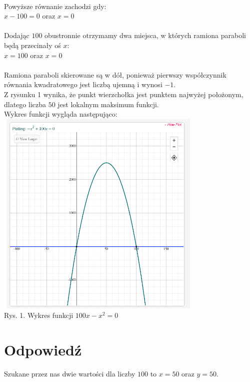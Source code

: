 \documentclass[UTF8]{article}
\begin{document}
\\Powyższe równanie zachodzi gdy:~
\\$x-100 = 0$ oraz $x=0$\\
\\Dodając $100$ obustronnie otrzymamy dwa miejsca, w których ramiona paraboli będą przecinały oś $x$:~
\\$x = 100$ oraz $x = 0$\\
\\Ramiona paraboli skierowane są w dół, ponieważ pierwszy współczynnik równania kwadratowego jest liczbą ujemną i wynosi $-1$. ~ 
\\Z rysunku 1 wynika, że punkt wierzchołka jest punktem najwyżej położonym, dlatego liczba $50$ jest lokalnym maksimum funkcji.~ 
\\Wykres funkcji wygląda następująco:~\\

\includegraphics[width=10cm, height=10cm]{parab}\\
Rys. 1. Wykres funkcji $100x - x^{2} = 0$



\section{Odpowiedź}

	Szukane przez nas dwie wartości dla liczby $100$ to $x = 50$ oraz $y = 50$. ~
\end{document}
